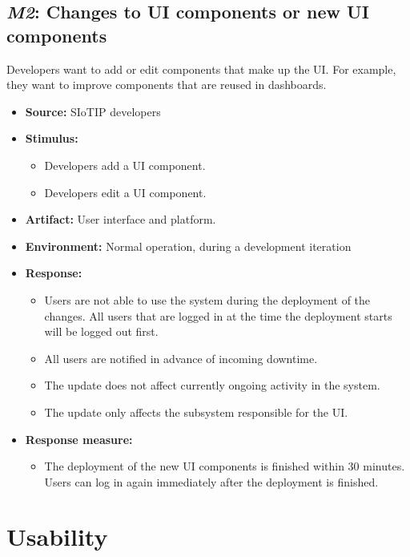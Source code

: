 \subsection{\emph{M2}: Changes to UI components or new UI components}
Developers want to add or edit components that make up the UI.
For example, they want to improve components that are reused in dashboards.

\begin{itemize}
    \item \textbf{Source:} SIoTIP developers
    \item \textbf{Stimulus:}
        \begin{itemize}
            \item Developers add a UI component.
            \item Developers edit a UI component.
        \end{itemize}

    \item \textbf{Artifact:} User interface and platform.
    \item \textbf{Environment:} Normal operation, during a development iteration
    \item \textbf{Response:}
        \begin{itemize}
            \item Users are not able to use the system during the deployment
                  of the changes. All users that are logged in at the time
                  the deployment starts will be logged out first.
            \item All users are notified in advance of incoming downtime.
            \item The update does not affect currently ongoing activity in
                  the system.
            \item The update only affects the subsystem responsible for the UI.
        \end{itemize}

    \item \textbf{Response measure:}
        \begin{itemize}
            \item The deployment of the new UI components is finished within 30 minutes.
                  Users can log in again immediately after the deployment is finished.
        \end{itemize}
\end{itemize}

\section{Usability}
